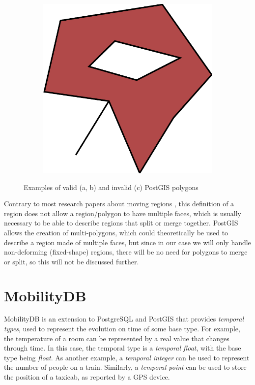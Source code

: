 \begin{figure}[h!]
\begin{subfigure}{.3\textwidth}
  \centering
  \includegraphics[width=.8\linewidth]{images/polygon_spike.pdf}
  \caption{}
  \label{fig:polygon_spike}
\end{subfigure}
\caption{Examples of valid (a, b) and invalid (c) PostGIS polygons}
\label{fig:postgis_polygon}
\end{figure}

Contrary to most research papers about moving regions \cite{polyhedra,model_structure_for_mod,moving_obj_foundation}, this definition of a region does not allow a region/polygon to have multiple faces, which is usually necessary to be able to describe regions that split or merge together. PostGIS allows the creation of multi-polygons, which could theoretically be used to describe a region made of multiple faces, but since in our case we will only handle non-deforming (fixed-shape) regions, there will be no need for polygons to merge or split, so this will not be discussed further.

\section{MobilityDB}
\label{section:mobilitydb}

MobilityDB \cite{mobilitydb} is an extension to PostgreSQL and PostGIS that provides \textit{temporal types}, used to represent the evolution on time of some base type. For example, the temperature of a room can be represented by a real value that changes through time. In this case, the temporal type is a \textit{temporal float}, with the base type being \textit{float}. As another example, a \textit{temporal integer} can be used to represent the number of people on a train. Similarly, a \textit{temporal point} can be used to store the position of a taxicab, as reported by a GPS device.

